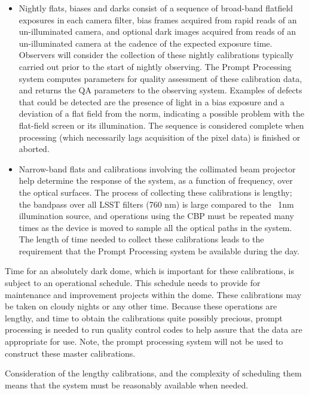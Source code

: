 \begin{itemize}

\item Nightly flats, biases and darks consist of a sequence of  broad-band
flatfield exposures in each camera filter, bias frames acquired from
rapid reads of an un-illuminated camera, and optional dark images
acquired from reads of an un-illuminated camera at the cadence of the
expected exposure time.  Observers will consider the collection of
these nightly calibrations
typically carried out prior to the start of nightly observing.  The
Prompt Processing system computes parameters for quality assessment of
these calibration data, and returns the QA parameters to the observing
system.  Examples of defects that could be detected are the presence
of light in a bias exposure and a deviation of a flat field from the
norm, indicating a possible problem with the flat-field screen or its
illumination.  The sequence is considered complete when processing
(which necessarily lags acquisition of the pixel data) is finished or
aborted.

\item Narrow-band flats and calibrations involving the collimated beam
projector help determine the response of the system, as a function of
frequency, over the optical surfaces.  The process of collecting these
calibrations is lengthy; the bandpass over all LSST filters (760 nm)
is large compared to the ~1nm illumination source, and operations
using the CBP must be repeated many times as the device is moved to
sample all the optical paths in the system.  The length of time needed
to collect these calibrations leads to the requirement that the Prompt
Processing system be available during the day. \\

\end{itemize}

Time for an absolutely dark dome, which is important for these
calibrations, is subject to an operational schedule.  This schedule
needs to provide for maintenance and improvement projects within the
dome.  These calibrations may be taken on cloudy nights or any other
time.  Because these operations are lengthy, and time to obtain the
calibrations quite possibly precious, prompt processing is needed to
run quality control codes to help assure that the data are appropriate for
use. Note, the prompt processing system will not be used to construct
these master calibrations.

Consideration of the lengthy calibrations, and the complexity of
scheduling them means that the system must be reasonably available
when needed.



